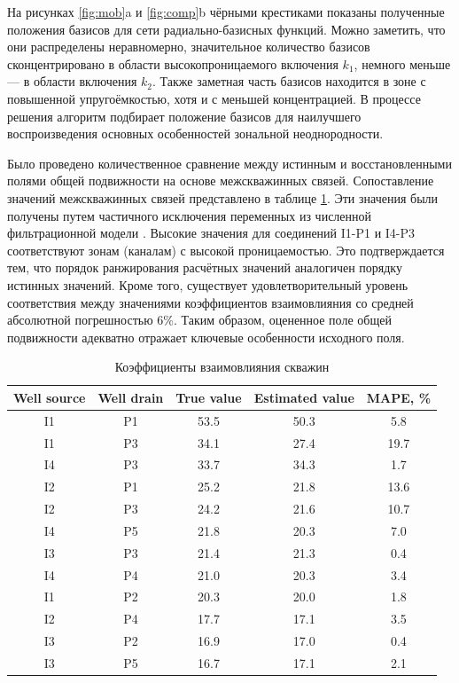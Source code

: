 \documentclass{article}
\begin{document}
На рисунках \ref{fig:mob}a и \ref{fig:comp}b чёрными крестиками показаны полученные положения базисов для сети радиально-базисных функций. Можно заметить, что они распределены неравномерно, значительное количество базисов сконцентрировано в области высокопроницаемого включения $k_1$, немного меньше — в области включения $k_2$. Также заметная часть базисов находится в зоне с повышенной упругоёмкостью, хотя и с меньшей концентрацией. В процессе решения алгоритм подбирает положение базисов для наилучшего воспроизведения основных особенностей зональной неоднородности. 

Было проведено количественное сравнение между истинным и восстановленными полями общей подвижности на основе межскважинных связей. Сопоставление значений межскважинных связей представлено в таблице \ref{tabl:connection}. Эти значения были получены путем частичного исключения переменных из численной фильтрационной модели \cite{and}. Высокие значения для соединений I1-P1 и I4-P3 соответствуют зонам (каналам) с высокой проницаемостью. Это подтверждается тем, что порядок ранжирования расчётных значений аналогичен порядку истинных значений. Кроме того, существует удовлетворительный уровень соответствия между значениями коэффициентов взаимовлияния со средней абсолютной погрешностью 6\%. Таким образом, оцененное поле общей подвижности адекватно отражает ключевые особенности исходного поля. 

\begin{table}[h!]
	\caption{Коэффициенты взаимовлияния скважин}	
	\label{tabl:connection}	
	\begin{center}
		\begin{tabular}{c|c|c|c|c}
			\hline
			Well source &  Well drain & True value & Estimated  value & MAPE, \% \\
			\hline
			I1 & P1 & 53.5 & 50.3 & 5.8 \\
			I1 & P3 & 34.1 & 27.4 & 19.7 \\
			I4 & P3 & 33.7 & 34.3 & 1.7 \\
			I2 & P1 & 25.2 & 21.8 & 13.6 \\
			I2 & P3 & 24.2 & 21.6 & 10.7 \\
			I4 & P5 & 21.8 & 20.3 & 7.0 \\
			I3 & P3 & 21.4 & 21.3 & 0.4 \\
			I4 & P4 & 21.0 & 20.3 & 3.4 \\
			I1 & P2 & 20.3 & 20.0 & 1.8 \\
			I2 & P4 & 17.7 & 17.1 & 3.5 \\
			I3 & P2 & 16.9 & 17.0 & 0.4 \\
			I3 & P5 & 16.7 & 17.1 & 2.1 \\
			\hline
		\end{tabular}
	\end{center}
\end{table}
\end{document}
